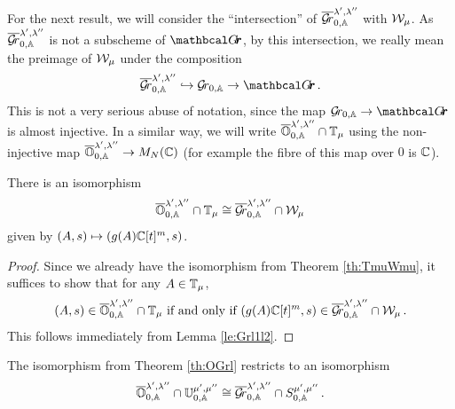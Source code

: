 \documentclass[draft]{article}
\begin{document}
For the next result, we will consider the ``intersection'' of $ \overline{\mathcal{G}\!r}^{\lambda', \lambda''}_{0,\mathbb A} $ with $\mathcal W_\mu$.  
As $  \overline{\mathcal{G}\!r}^{\lambda', \lambda''}_{0,\mathbb A} $ is not a subscheme of $ \Grth$, by this intersection, we really mean the preimage of $ \mathcal W_\mu$ under the composition
$$ 
\overline{\Gr}^{\lambda', \lambda''}_{0,\AA}  \hookrightarrow \Grbd \rightarrow \Grth\,.
$$
This is not a very serious abuse of notation, since the map $ \Grbd \rightarrow \Grth $ is almost injective. 
In a similar way, we will write $ \overline{\mathbb O}^{\lambda', \lambda''}_{0,\mathbb A} \cap \mathbb T_\mu$ using the non-injective map $ \overline{\mathbb O}^{\lambda', \lambda''}_{0,\mathbb A} \rightarrow M_N(\mathbb C)$ (for example the fibre of this map over $ 0 $ is $ \mathbb C $). 

\begin{theorem} \label{th:OGrl}
    There is an isomorphism
    $$\overline{\mathbb O}^{\lambda', \lambda''}_{0,\mathbb A} \cap \mathbb T_\mu \cong \overline{\mathcal{G}\!r}^{\lambda', \lambda''}_{0,\mathbb A} \cap \mathcal W_\mu $$
    given by $ (A,s) \mapsto (g(A)\mathbb C[t]^m, s)$.
\end{theorem}
\begin{proof}
Since we already have the isomorphism from Theorem \ref{th:TmuWmu}, it suffices to show that for any $ A \in \mathbb T_\mu$, 
$$ 
(A,s) \in \overline{\mathbb O}^{\lambda', \lambda''}_{0,\mathbb A} \cap \mathbb T_\mu \text{ if and only if } (g(A)\mathbb C[t]^m, s) \in \overline{\mathcal{G}\!r}^{\lambda', \lambda''}_{0,\mathbb A} \cap \mathcal W_\mu \,. 
$$
This follows immediately from Lemma \ref{le:Grl1l2}.
\end{proof}
% 
\begin{theorem}
    The isomorphism from Theorem \ref{th:OGrl} restricts to an isomorphism
    $$ 
    \overline{\mathbb O}^{\lambda', \lambda''}_{0,\mathbb A} \cap \mathbb U^{\mu', \mu''}_{0,\mathbb A} \cong \overline{\mathcal{G}\!r}^{\lambda', \lambda''}_{0,\mathbb A} \cap S^{\mu', \mu''}_{0,\mathbb A}\,.
    $$
\end{theorem}
\end{document}
